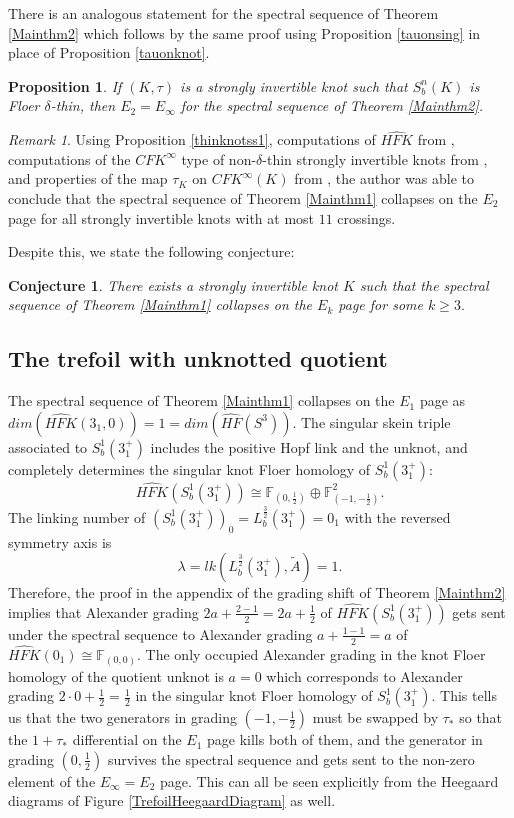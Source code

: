 \documentclass[11pt]{amsart}
\newtheorem{proposition}[theorem]{Proposition}
\newtheorem{Conjecture}[Theorem]{Conjecture}
\theoremstyle{definition}
\theoremstyle{remark}
\newtheorem{remark}[theorem]{Remark}
\def\F{\mathbb{F}}
\def\HF {\mathit{HF}}
\def\HFK {\mathit{HFK}}
\newcommand\HFKhat{\widehat{\HFK}}
\newcommand\HFhat{\widehat{\HF}}
\numberwithin{equation}{section}
\begin{document}
There is an analogous statement for the spectral sequence of Theorem \ref{Mainthm2} which follows by the same proof using Proposition \ref{tauonsing} in place of Proposition \ref{tauonknot}.
\begin{proposition}
    If $(K,\tau)$ is a strongly invertible knot such that $S^n_b(K)$ is Floer $\delta$-thin, then $E_2=E_\infty$ for the spectral sequence of Theorem \ref{Mainthm2}.
\end{proposition}
\begin{remark}\label{thm1collapse<12}Using Proposition \ref{thinknotss1}, computations of $\HFKhat$ from \cite{baldwin2007computationsheegaardfloerknothomology}, computations of the $CFK^\infty$ type of non-$\delta$-thin strongly invertible knots from \cite{antal2023note}, and properties of the map $\tau_{K}$ on $CFK^\infty(K)$ from \cite[~Theorem 1.7]{DMSE}, the author was able to conclude that the spectral sequence of Theorem \ref{Mainthm1} collapses on the $E_2$ page for all strongly invertible knots with at most $11$ crossings.
\end{remark}Despite this, we state the following conjecture:
\begin{Conjecture}\label{pagecollapse}
    There exists a strongly invertible knot $K$ such that the spectral sequence of Theorem \ref{Mainthm1} collapses on the $E_k$ page for some $k\ge 3.$
\end{Conjecture}


\subsection{The trefoil with unknotted quotient}\label{31plus}
    The spectral sequence of Theorem \ref{Mainthm1} collapses on the $E_1$ page as $dim(\HFKhat(3_1,0))=1=dim(\HFhat(S^3))$. The singular skein triple associated to $S^1_b(3_1^+)$ includes the positive Hopf link and the unknot, and completely determines the singular knot Floer homology of $S^1_b(3_1^+)$:\[\HFKhat(S^1_b(3_1^+))\cong \F_{(0,\frac{1}{2})}\oplus\F^2_{(-1,-\frac{1}{2})}.\]The linking number of $(S^1_b(3_1^+))_0=L_b^{\frac{3}{2}}(3_1^+)=0_1$ with the reversed symmetry axis is \[\lambda=lk(L_b^{\frac{3}{2}}(3_1^+),\widetilde{A})=1.\] Therefore, the proof in the appendix of the grading shift of Theorem \ref{Mainthm2} implies that Alexander grading $2a+\frac{2-1}{2}=2a+\frac{1}{2}$ of $\HFKhat(S^1_b(3_1^+))$ gets sent under the spectral sequence to Alexander grading $a+\frac{1-1}{2}=a$ of $\HFKhat(0_1)\cong \F_{(0,0)}$. The only occupied Alexander grading in the knot Floer homology of the quotient unknot is $a=0$ which corresponds to Alexander grading $2\cdot 0+\frac{1}{2}=\frac{1}{2}$ in the singular knot Floer homology of $S_b^1(3_1^+)$. This tells us that the two generators in grading $(-1,-\frac{1}{2})$ must be swapped by $\tau_*$ so that the $1+\tau_*$ differential on the $E_1$ page kills both of them, and the generator in grading $(0,\frac{1}{2})$ survives the spectral sequence and gets sent to the non-zero element of the $E_\infty=E_2$ page. This can all be seen explicitly from the Heegaard diagrams of Figure \ref{TrefoilHeegaardDiagram} as well.
\end{document}
